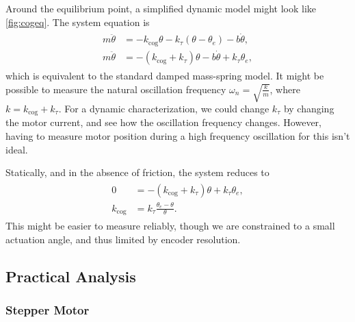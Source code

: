 \documentclass[12pt,a4paper,oneside,openany]{article}
\begin{document}
Around the equilibrium point, a simplified dynamic model might look like \cref{fig:cogeq}. The system equation is 
\begin{gather}
\begin{aligned}
m \ddot{\theta} &= - k_{\textrm{cog}} \theta - k_{\tau} \left(\theta - \theta_e \right) - b \dot{\theta}, \\
m \ddot{\theta} &= - \left(k_{\textrm{cog}} + k_{\tau} \right) \theta - b \dot{\theta} + k_{\tau} \theta_e,
\end{aligned}
\end{gather}
which is equivalent to the standard damped mass-spring model. It might be possible to measure the natural oscillation frequency $\omega_n = \sqrt{\frac{k}{m}}$, where $k=k_{\textrm{cog}} + k_{\tau}$. For a dynamic characterization, we could change $k_{\tau}$ by changing the motor current, and see how the oscillation frequency changes. However, having to measure motor position during a high frequency oscillation for this isn't ideal.

Statically, and in the absence of friction, the system reduces to 
\begin{gather}
\begin{aligned}
0 &= - \left(k_{\textrm{cog}} + k_{\tau} \right) \theta + k_{\tau} \theta_e, \\
k_{\textrm{cog}} &= k_{\tau} \frac{\theta_e - \theta }{\theta} .
\end{aligned}
\end{gather}
This might be easier to measure reliably, though we are constrained to a small actuation angle, and thus limited by encoder resolution.

\subsection{Practical Analysis}

\subsubsection{Stepper Motor}
\end{document}
